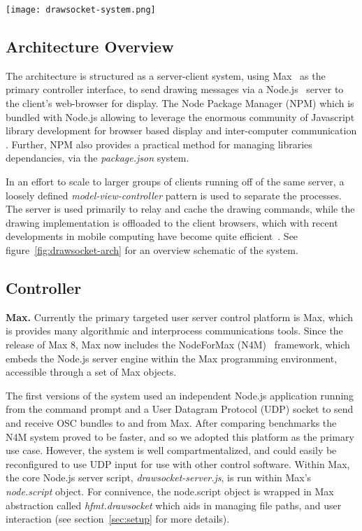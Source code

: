 \begin{figure*}[]
\centering
\texttt{[image: drawsocket-system.png]}
\caption{\drawsocket Sever/Client Architecture. 
\label{fig:drawsocket-arch}}
\end{figure*}

\subsection{Architecture Overview}
The \drawsocket architecture is structured as a server-client system, using Max~\cite{puckette:max} as the primary controller interface, to send drawing messages via a Node.js~\cite{tilkov2010node} server to the client's web-browser for display. 
The Node Package Manager (NPM) which is bundled with Node.js allowing \drawsocket to leverage the enormous community of Javascript library development for browser based display and inter-computer communication \cite{trockman2018adding}. 
Further, NPM also provides a practical method for managing libraries dependancies, via the \textit{package.json} system.

In an effort to scale to larger groups of clients running off of the same server, a loosely defined \textit{model-view-controller} \cite{krasner1988description} pattern is used to separate the processes. 
The server is used primarily to relay and cache the drawing commands, while the drawing implementation is offloaded to the client browsers, which with recent developments in mobile computing have become quite efficient~\cite{halpern2016mobile}.
See figure~\ref{fig:drawsocket-arch} for an overview schematic of the system. 

\subsection{Controller}
\noindent
\textbf{Max.}
Currently the primary targeted user server control platform is Max, which is provides many algorithmic and interprocess communications tools. 
Since the release of Max 8, Max now includes the NodeForMax (N4M)~\cite{nodeformax} framework, which embeds the Node.js server engine within the Max programming environment, accessible through a set of Max objects.

The first versions of the \drawsocket system used an independent Node.js application running from the command prompt and a User Datagram Protocol (UDP) socket \cite{postel1980user} to send and receive OSC bundles to and from Max.
After comparing benchmarks the N4M system proved to be faster, and so we adopted this platform as the primary use case.
However, the \drawsocket system is well compartmentalized, and could easily be reconfigured to use UDP input for use with other control software.
Within Max, the core Node.js server script, \textit{drawsocket-server.js}, is run within Max's \textit{node.script} object. For connivence, the node.script object is wrapped in Max abstraction called \textit{hfmt.drawsocket} which aids in managing file paths, and user interaction (see section~\ref{sec:setup} for more details).

